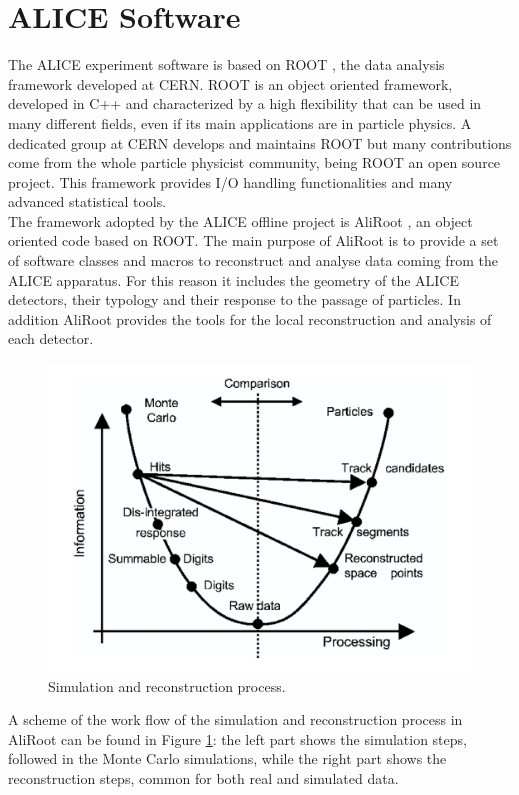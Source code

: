 \section{ALICE Software}
\label{datavol}
The ALICE experiment software is based on ROOT \cite{ROOT}, the data analysis framework developed at CERN. ROOT is an object oriented framework, developed in C++ and characterized by a high flexibility that can be used in many different fields, even if its main applications are in particle physics. A dedicated group at CERN develops and maintains ROOT but many contributions come from the whole particle physicist community, being ROOT an open source project. This framework provides I/O handling functionalities and many advanced statistical tools.\\
The framework adopted by the ALICE offline project is AliRoot \cite{AliRoot}, an object oriented code based on ROOT. The main purpose of AliRoot is to provide a set of software classes and macros to reconstruct and analyse data coming from the ALICE apparatus. For this reason it includes the geometry of the ALICE detectors, their typology and their response to the passage of particles. In addition AliRoot provides the tools for the local reconstruction and analysis of each detector.\\
\begin{figure}
  \centering
  \includegraphics[scale=0.30]{figures/reconstruction.png}
  \caption{Simulation and reconstruction process.}
  \label{fig:Rec}
\end{figure}
%
A scheme of the work flow of the simulation and reconstruction process in AliRoot can be found in Figure \ref{fig:Rec}: the left part shows the simulation steps, followed in the Monte Carlo simulations, while the right part shows the reconstruction steps, common for both real and simulated data.\\
